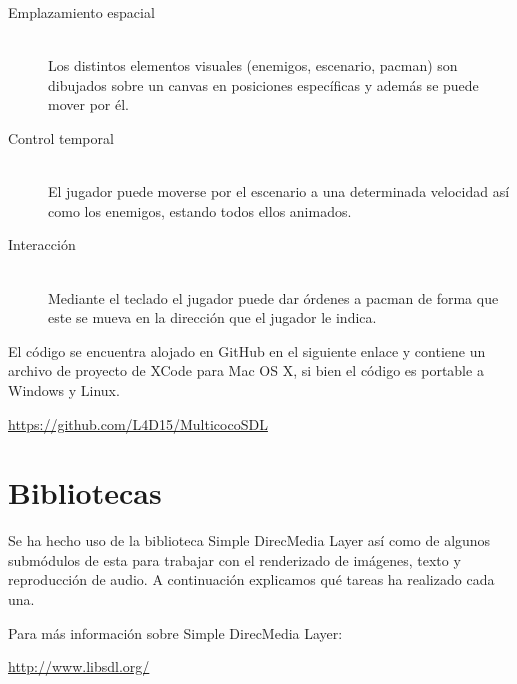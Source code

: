 \documentclass[parskip=half*]{scrartcl}
\begin{document}
\begin{description}
	\item[Emplazamiento espacial]	\hfill \\	Los distintos elementos visuales (enemigos, escenario, pacman) son dibujados sobre un canvas en posiciones específicas y además se puede mover por él.
	\item[Control temporal] 		\hfill \\	El jugador puede moverse por el escenario a una determinada velocidad así como los enemigos, estando todos ellos animados.
	\item[Interacci\'on]			\hfill \\	Mediante el teclado el jugador puede dar \'ordenes a pacman de forma que este se mueva en la direcci\'on que el jugador le indica.
\end{description}

El c\'odigo se encuentra alojado en GitHub en el siguiente enlace y contiene un archivo de proyecto de XCode para Mac OS X, si bien el c\'odigo es portable a Windows y Linux. \\

\centerline{\url{https://github.com/L4D15/MulticocoSDL}}


\newpage
\section{Bibliotecas}
Se ha hecho uso de la biblioteca Simple DirecMedia Layer as\'i como de algunos subm\'odulos de esta para trabajar con el renderizado de im\'agenes, texto y reproducci\'on de audio. A continuaci\'on explicamos qu\'e tareas ha realizado cada una.

Para m\'as información sobre Simple DirecMedia Layer: \\

\centerline{\url{http://www.libsdl.org/}}

\end{document}

